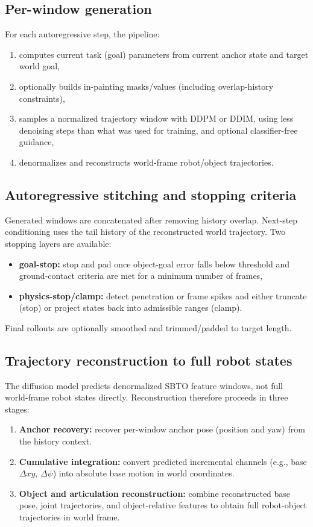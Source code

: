\subsection{Per-window generation}

For each autoregressive step, the pipeline:
\begin{enumerate}
    \item computes current task (goal) parameters from current anchor state and target world goal,
    \item optionally builds in-painting masks/values (including overlap-history constraints),
    \item samples a normalized trajectory window with DDPM or DDIM, using less denoising steps than what was used for training, and optional classifier-free guidance,
    \item denormalizes and reconstructs world-frame robot/object trajectories.
\end{enumerate}

\subsection{Autoregressive stitching and stopping criteria}

Generated windows are concatenated after removing history overlap. Next-step conditioning uses the tail history of the reconstructed world trajectory. Two stopping layers are available:
\begin{itemize}
    \item \textbf{goal-stop:} stop and pad once object-goal error falls below threshold and ground-contact criteria are met for a minimum number of frames,
    \item \textbf{physics-stop/clamp:} detect penetration or frame spikes and either truncate (stop) or project states back into admissible ranges (clamp).
\end{itemize}

Final rollouts are optionally smoothed and trimmed/padded to target length.

\subsection{Trajectory reconstruction to full robot states}

The diffusion model predicts denormalized SBTO feature windows, not full world-frame robot states directly. Reconstruction therefore proceeds in three stages:
\begin{enumerate}
    \item \textbf{Anchor recovery:} recover per-window anchor pose (position and yaw) from the history context.
    \item \textbf{Cumulative integration:} convert predicted incremental channels (e.g., base $\Delta xy$, $\Delta\psi$) into absolute base motion in world coordinates.
    \item \textbf{Object and articulation reconstruction:} combine reconstructed base pose, joint trajectories, and object-relative features to obtain full robot-object trajectories in world frame.
\end{enumerate}

